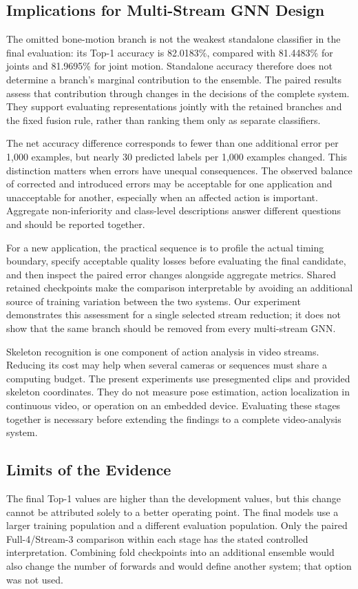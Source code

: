 \documentclass[ai,article,submit,moreauthors]{Definitions/mdpi}
\begin{document}
\subsection{Implications for Multi-Stream GNN Design}
The omitted bone-motion branch is not the weakest standalone classifier in the final evaluation: its Top-1 accuracy is 82.0183\%, compared with 81.4483\% for joints and 81.9695\% for joint motion. Standalone accuracy therefore does not determine a branch's marginal contribution to the ensemble. The paired results assess that contribution through changes in the decisions of the complete system. They support evaluating representations jointly with the retained branches and the fixed fusion rule, rather than ranking them only as separate classifiers.

The net accuracy difference corresponds to fewer than one additional error per 1,000 examples, but nearly 30 predicted labels per 1,000 examples changed. This distinction matters when errors have unequal consequences. The observed balance of corrected and introduced errors may be acceptable for one application and unacceptable for another, especially when an affected action is important. Aggregate non-inferiority and class-level descriptions answer different questions and should be reported together.

For a new application, the practical sequence is to profile the actual timing boundary, specify acceptable quality losses before evaluating the final candidate, and then inspect the paired error changes alongside aggregate metrics. Shared retained checkpoints make the comparison interpretable by avoiding an additional source of training variation between the two systems. Our experiment demonstrates this assessment for a single selected stream reduction; it does not show that the same branch should be removed from every multi-stream GNN.

Skeleton recognition is one component of action analysis in video streams. Reducing its cost may help when several cameras or sequences must share a computing budget. The present experiments use presegmented clips and provided skeleton coordinates. They do not measure pose estimation, action localization in continuous video, or operation on an embedded device. Evaluating these stages together is necessary before extending the findings to a complete video-analysis system.

\subsection{Limits of the Evidence}
The final Top-1 values are higher than the development values, but this
change cannot be attributed solely to a better operating point. The final
models use a larger training population and a different evaluation population.
Only the paired Full-4/Stream-3 comparison within each stage has the stated
controlled interpretation. Combining fold checkpoints into an additional
ensemble would also change the number of forwards and would define another
system; that option was not used.
\end{document}
